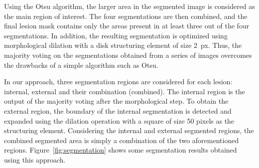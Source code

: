 Using the Otsu algorithm, the larger area in the segmented image is considered as the main region of interest.
The four segmentations are then combined, and the final lesion mask contains only the areas present in at least three out of the four segmentations.
In addition, the resulting segmentation is optimized using morphological dilation with a disk structuring element of size 2~\si{px}.
Thus, the majority voting on the segmentations obtained from a series of images overcomes the drawbacks of a simple algorithm such as Otsu.

In our approach, three segmentation regions are considered for each lesion: internal, external and their combination (combined).
The internal region is the output of the majority voting after the morphological step.
To obtain the external region, the boundary of the internal segmentation is detected and expanded using the dilation operation with a square of size 50 pixels as the structuring element.
Considering the internal and external segmented regions, the combined segmented area is simply a combination of the two aforementioned regions.
Figure~\ref{fig:segmentation} shows some segmentation results obtained using this approach.

